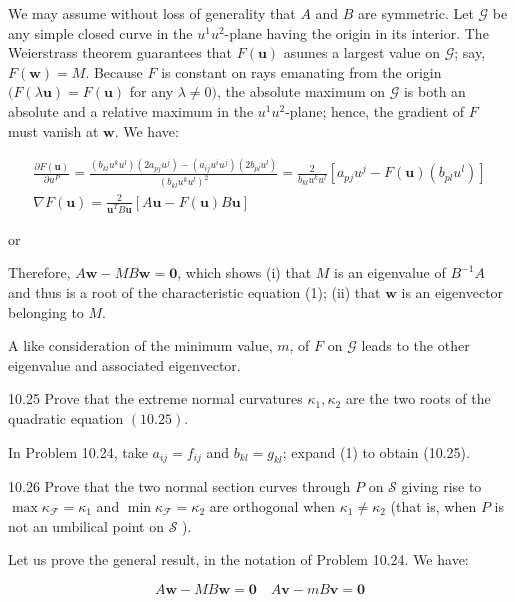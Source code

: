 \documentclass[10pt]{article}
\begin{document}
We may assume without loss of generality that $A$ and $B$ are symmetric. Let $\mathscr{G}$ be any simple closed curve in the $u^{1} u^{2}$-plane having the origin in its interior. The Weierstrass theorem guarantees that $F(\mathbf{u})$ asumes a largest value on $\mathscr{G}$; say, $F(\mathbf{w})=M$. Because $F$ is constant on rays emanating from the origin $(F(\lambda \mathbf{u})=F(\mathbf{u})$ for any $\lambda \neq 0)$, the absolute maximum on $\mathscr{G}$ is both an absolute and a relative maximum in the $u^{1} u^{2}$-plane; hence, the gradient of $F$ must vanish at $\mathbf{w}$. We have:

$$
\begin{gathered}
\frac{\partial F(\mathbf{u})}{\partial u^{P}}=\frac{\left(b_{k l} u^{k} u^{l}\right)\left(2 a_{p j} u^{j}\right)-\left(a_{i j} u^{i} u^{j}\right)\left(2 b_{p l} u^{l}\right)}{\left(b_{k l} u^{k} u^{l}\right)^{2}}=\frac{2}{b_{k l} u^{k} u^{l}}\left[a_{p j} u^{j}-F(\mathbf{u})\left(b_{p l} u^{l}\right)\right] \\
\nabla F(\mathbf{u})=\frac{2}{\mathbf{u}^{T} B \mathbf{u}}[A \mathbf{u}-F(\mathbf{u}) B \mathbf{u}]
\end{gathered}
$$

or

Therefore, $A \mathbf{w}-M B \mathbf{w}=\mathbf{0}$, which shows (i) that $M$ is an eigenvalue of $B^{-1} A$ and thus is a root of the characteristic equation (1); (ii) that $\mathbf{w}$ is an eigenvector belonging to $M$.

A like consideration of the minimum value, $m$, of $F$ on $\mathscr{G}$ leads to the other eigenvalue and associated eigenvector.

10.25 Prove that the extreme normal curvatures $\kappa_{1}, \kappa_{2}$ are the two roots of the quadratic equation $(10.25)$.

In Problem 10.24, take $a_{i j}=f_{i j}$ and $b_{k l}=g_{k l}$; expand (1) to obtain (10.25).

10.26 Prove that the two normal section curves through $P$ on $\mathscr{S}$ giving rise to $\max \kappa_{\mathscr{F}}=\kappa_{1}$ and $\min \kappa_{\mathscr{F}}=\kappa_{2}$ are orthogonal when $\kappa_{1} \neq \kappa_{2}$ (that is, when $P$ is not an umbilical point on $\mathscr{S}$ ).

Let us prove the general result, in the notation of Problem 10.24. We have:

$$
A \mathbf{w}-M B \mathbf{w}=\mathbf{0} \quad A \mathbf{v}-m B \mathbf{v}=\mathbf{0}
$$
\end{document}
